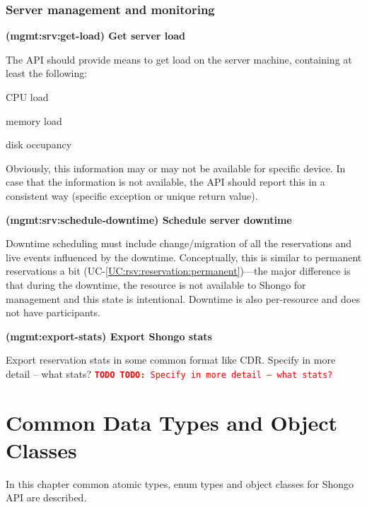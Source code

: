 \documentclass[a4paper]{report}
\makeatletter
\newcounter{UCcounter}
\newenvironment{UseCases}%
	{\begin{list}{\textbf{UC-\arabic{UCcounter}}}{\@nmbrlisttrue\def\@listctr{UCcounter}}}%
	{\end{list}}
\newcommand{\UClabel}[1]{\label{UC:#1}}
\newcommand{\UCref}[1]{UC-\ref{UC:#1}}
\newcommand{\UseCase}[2]{\item\UClabel{#2} \textbf{(#2) #1}\\ \nopagebreak}
\newcommand{\TODO}[1]{%
\def\empty{}%
\def\prvniparametr{#1}%
\ifx\prvniparametr\empty%
\begingroup\tt\textcolor{red}{\noindent\textbf{TODO}}\endgroup
\else%
\begingroup\tt\textcolor{red}{\noindent\textbf{TODO:}\ #1}\endgroup
\fi%
}
\makeatother
\begin{document}
\subsection{Server management and monitoring}

\begin{UseCases}

\UseCase{Get server load}{mgmt:srv:get-load}

The API should provide means to get load on the server machine, containing at
least the following:

\begin{compactitem}

\item CPU load

\item memory load

\item disk occupancy

\end{compactitem}

Obviously, this information may or may not be available for specific device.
In case that the information is not available, the API should report this in a
consistent way (specific exception or unique return value).


\UseCase{Schedule server downtime}{mgmt:srv:schedule-downtime}

Downtime scheduling must include change/migration of all the reservations and
live events influenced by the downtime. Conceptually, this is similar to
permanent reservations a bit (\UCref{rsv:reservation:permanent})---the major
difference is that during the downtime, the resource is not available to Shongo
for management and this state is intentional. Downtime is also per-resource and
does not have participants.

\UseCase{Export Shongo stats}{mgmt:export-stats}

Export reservation stats in some common format like CDR.
\TODO{Specify in more detail -- what stats?}

\end{UseCases}




\chapter{Common Data Types and Object Classes}

In this chapter common atomic types, enum types and object classes for Shongo API are described.
\end{document}
